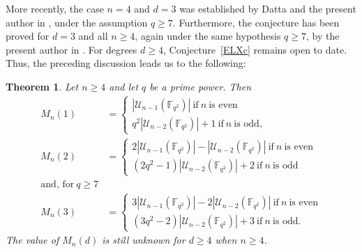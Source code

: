 \documentclass[10pt,a4paper,oneside]{amsproc}
\newtheorem{theorem}{Theorem}[section]
\newcommand{\U}{\mathcal{U}}
\def\FF{{\mathbb F}}
\begin{document}
More recently, the case $n=4$ and $d=3$ was established by Datta and the present author in \cite{DM}, under the assumption $q\geq 7$. Furthermore, the conjecture has been proved for $d=3$ and all $n\geq 4$, again under the same hypothesis $q\geq 7$, by the present author in \cite{S1}. For degrees $d\geq 4$, Conjecture~\ref{ELXc} remains open to date. Thus, the preceding discussion leads us to the following: 

\begin{theorem}\label{lit}
Let $n \geq 4$ and let $q$ be a prime power. Then
$$
\begin{aligned}
M_n(1) &=
\begin{cases}
|\U_{n-1}(\FF_{q^2})| 
\ \text{if} \ n \ \text{is even} \\
q^2 |\U_{n-2}(\FF_{q^2})| + 1 
\ \text{if} \ n \ \text{is odd},
\end{cases} \\
M_n(2) &=
\begin{cases}
2|\U_{n-1}(\FF_{q^2})| - |\U_{n-2}(\FF_{q^2})| \ \text{if} \ n \ \text{is even}
 \\
(2q^2 - 1)|\U_{n-2}(\FF_{q^2})| + 2
\ \text{if} \ n \ \text{is odd}
\end{cases} \\ \text{and, for}\ q\geq 7\\
M_n(3) &=
\begin{cases}
3|\U_{n-1}(\FF_{q^2})| - 2|\U_{n-2}(\FF_{q^2})|
\ \text{if} \ n \ \text{is even} \\
(3q^2 - 2)|\U_{n-2}(\FF_{q^2})| + 3
\ \text{if} \ n \ \text{is odd}.
\end{cases}
\end{aligned}
$$ The value of $M_n(d)$ is still unknown for $d \ge 4$ when $n \ge 4$.
\end{theorem}

\end{document}
